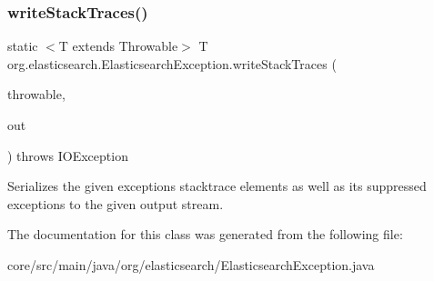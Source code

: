 \subsubsection{\texorpdfstring{write\+Stack\+Traces()}{writeStackTraces()}}
{\footnotesize\ttfamily static $<$T extends Throwable$>$ T org.\+elasticsearch.\+Elasticsearch\+Exception.\+write\+Stack\+Traces (\begin{DoxyParamCaption}\item[{T}]{throwable,  }\item[{Stream\+Output}]{out }\end{DoxyParamCaption}) throws I\+O\+Exception\hspace{0.3cm}{\ttfamily [static]}}

Serializes the given exceptions stacktrace elements as well as it\textquotesingle{}s suppressed exceptions to the given output stream. 

The documentation for this class was generated from the following file\+:\begin{DoxyCompactItemize}
\item 
core/src/main/java/org/elasticsearch/Elasticsearch\+Exception.\+java\end{DoxyCompactItemize}
